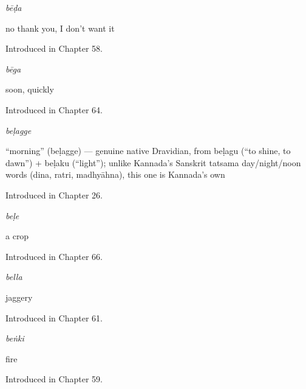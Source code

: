 \noindent\begin{minipage}[t]{\linewidth}
\raggedright
\textbf{}\enspace\emph{bēḍa}\par
\small no thank you, I don't want it\par
\footnotesize Introduced in Chapter 58.
\end{minipage}\par\medskip

\noindent\begin{minipage}[t]{\linewidth}
\raggedright
\textbf{}\enspace\emph{bēga}\par
\small soon, quickly\par
\footnotesize Introduced in Chapter 64.
\end{minipage}\par\medskip

\noindent\begin{minipage}[t]{\linewidth}
\raggedright
\textbf{}\enspace\emph{beḷagge}\par
\small \textquotedblleft{}morning\textquotedblright{} (beḷagge) — genuine native Dravidian, from beḷagu (\textquotedblleft{}to shine, to dawn\textquotedblright{}) + beḷaku (\textquotedblleft{}light\textquotedblright{}); unlike Kannada's Sanskrit tatsama day/night/noon words (dina, ratri, madhyāhna), this one is Kannada's own\par
\footnotesize Introduced in Chapter 26.
\end{minipage}\par\medskip

\noindent\begin{minipage}[t]{\linewidth}
\raggedright
\textbf{}\enspace\emph{beḷe}\par
\small a crop\par
\footnotesize Introduced in Chapter 66.
\end{minipage}\par\medskip

\noindent\begin{minipage}[t]{\linewidth}
\raggedright
\textbf{}\enspace\emph{bella}\par
\small jaggery\par
\footnotesize Introduced in Chapter 61.
\end{minipage}\par\medskip

\noindent\begin{minipage}[t]{\linewidth}
\raggedright
\textbf{}\enspace\emph{beṅki}\par
\small fire\par
\footnotesize Introduced in Chapter 59.
\end{minipage}\par\medskip

